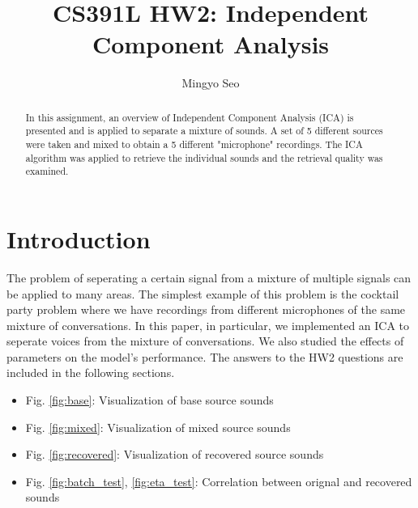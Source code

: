 \documentclass[conference]{IEEEtran}
\begin{document}
\title{CS391L HW2: Independent Component Analysis}

\author{Mingyo Seo}

\author{
}



\maketitle

\IEEEpeerreviewmaketitle

\begin{abstract}

In this assignment, an overview of Independent Component Analysis (ICA) is presented and is applied to separate a mixture of sounds. A set of 5 different sources were taken and mixed to obtain a 5 different "microphone" recordings. The ICA algorithm was applied to retrieve the individual sounds and the retrieval quality was examined.
\end{abstract}

\section{Introduction} %

The problem of seperating a certain signal from a mixture of multiple signals can be applied to many areas. The simplest example of this problem is the cocktail party problem where we have recordings from different microphones of the same mixture of conversations.
In this paper, in particular, we implemented an ICA to seperate voices from the mixture of conversations. 
We also studied the effects of parameters on the model's performance. The answers to the HW2 questions are included in the following sections.\begin{itemize}
\item Fig. \ref{fig:base}: Visualization of base source sounds
\item Fig. \ref{fig:mixed}: Visualization of mixed source sounds
\item Fig. \ref{fig:recovered}: Visualization of recovered source sounds
\item Fig. \ref{fig:batch_test}, \ref{fig:eta_test}: Correlation between orignal and recovered sounds
\end{itemize}
\end{document}
